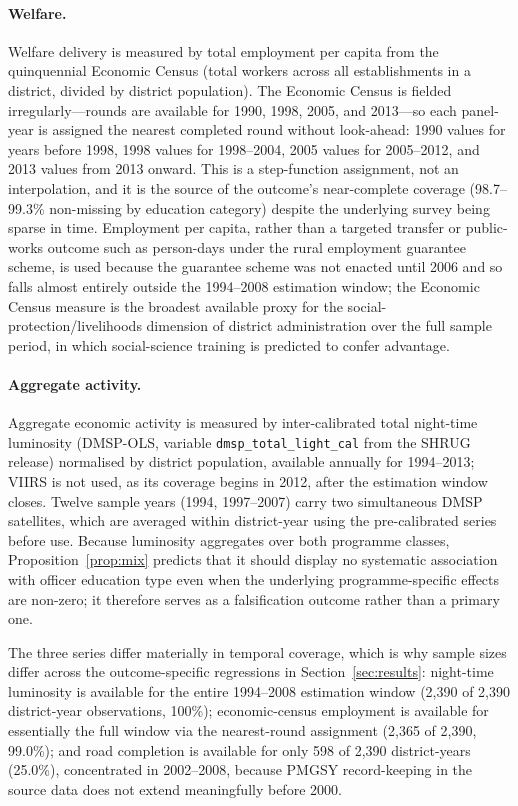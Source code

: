 \paragraph{Welfare.} Welfare delivery is measured by total employment per capita
from the quinquennial Economic Census (total workers across all establishments in a
district, divided by district population). The Economic Census is fielded
irregularly---rounds are available for 1990, 1998, 2005, and 2013---so each
panel-year is assigned the nearest completed round without look-ahead: 1990 values
for years before 1998, 1998 values for 1998--2004, 2005 values for 2005--2012, and
2013 values from 2013 onward. This is a step-function assignment, not an
interpolation, and it is the source of the outcome's near-complete coverage
(98.7--99.3\% non-missing by education category) despite the underlying survey being
sparse in time. Employment per capita, rather than a targeted transfer or
public-works outcome such as person-days under the rural employment guarantee
scheme, is used because the guarantee scheme was not enacted until 2006 and so falls
almost entirely outside the 1994--2008 estimation window; the Economic Census measure
is the broadest available proxy for the social-protection/livelihoods dimension of
district administration over the full sample period, in which social-science
training is predicted to confer advantage.

\paragraph{Aggregate activity.} Aggregate economic activity is measured by
inter-calibrated total night-time luminosity (DMSP-OLS, variable
\texttt{dmsp\_total\_light\_cal} from the SHRUG release) normalised by district
population, available annually for 1994--2013; VIIRS is not used, as its coverage
begins in 2012, after the estimation window closes. Twelve sample years (1994,
1997--2007) carry two simultaneous DMSP satellites, which are averaged within
district-year using the pre-calibrated series before use. Because luminosity
aggregates over both programme classes, Proposition~\ref{prop:mix} predicts that it
should display no systematic association with officer education type even when the
underlying programme-specific effects are non-zero; it therefore serves as a
falsification outcome rather than a primary one.

The three series differ materially in temporal coverage, which is why sample sizes
differ across the outcome-specific regressions in Section~\ref{sec:results}: night-time
luminosity is available for the entire 1994--2008 estimation window (2,390 of 2,390
district-year observations, 100\%); economic-census employment is available for
essentially the full window via the nearest-round assignment (2,365 of 2,390, 99.0\%);
and road completion is available for only 598 of 2,390 district-years (25.0\%),
concentrated in 2002--2008, because PMGSY record-keeping in the source data does not
extend meaningfully before 2000.

